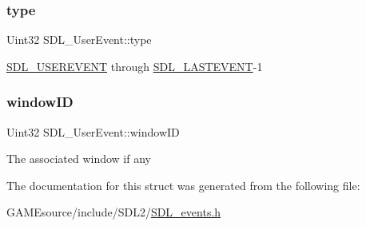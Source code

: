 \subsubsection{\texorpdfstring{type}{type}}
{\footnotesize\ttfamily Uint32 S\+D\+L\+\_\+\+User\+Event\+::type}

\mbox{\hyperlink{_s_d_l__events_8h_a3b589e89be6b35c02e0dd34a55f3fccaa4364c23f54802309e83fdb9b1c07c719}{S\+D\+L\+\_\+\+U\+S\+E\+R\+E\+V\+E\+NT}} through \mbox{\hyperlink{_s_d_l__events_8h_a3b589e89be6b35c02e0dd34a55f3fccaaffeac40a4ff366717c0ebc74118ea2ae}{S\+D\+L\+\_\+\+L\+A\+S\+T\+E\+V\+E\+NT}}-\/1 \mbox{\label{struct_s_d_l___user_event_abccefa10e0e0e3a0801bc6d836a08da7}} 
\subsubsection{\texorpdfstring{window\+ID}{windowID}}
{\footnotesize\ttfamily Uint32 S\+D\+L\+\_\+\+User\+Event\+::window\+ID}

The associated window if any 

The documentation for this struct was generated from the following file\+:\begin{DoxyCompactItemize}
\item 
G\+A\+M\+Esource/include/\+S\+D\+L2/\mbox{\hyperlink{_s_d_l__events_8h}{S\+D\+L\+\_\+events.\+h}}\end{DoxyCompactItemize}
